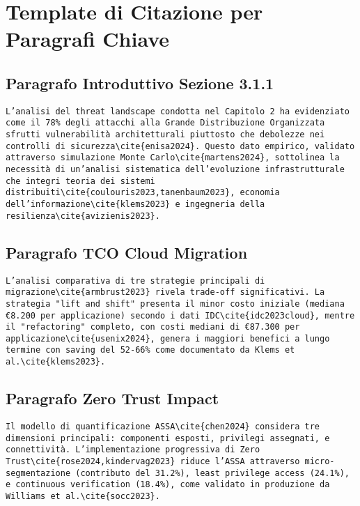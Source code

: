 \documentclass{article}
\begin{document}
\section*{Template di Citazione per Paragrafi Chiave}

\subsection*{Paragrafo Introduttivo Sezione 3.1.1}
\begin{tcolorbox}[colback=gray!10]
\small
\texttt{L'analisi del threat landscape condotta nel Capitolo 2 ha evidenziato come il 78\% degli attacchi alla Grande Distribuzione Organizzata sfrutti vulnerabilità architetturali piuttosto che debolezze nei controlli di sicurezza\textbackslash cite\{enisa2024\}. Questo dato empirico, validato attraverso simulazione Monte Carlo\textbackslash cite\{martens2024\}, sottolinea la necessità di un'analisi sistematica dell'evoluzione infrastrutturale che integri teoria dei sistemi distribuiti\textbackslash cite\{coulouris2023,tanenbaum2023\}, economia dell'informazione\textbackslash cite\{klems2023\} e ingegneria della resilienza\textbackslash cite\{avizienis2023\}.}
\end{tcolorbox}

\subsection*{Paragrafo TCO Cloud Migration}
\begin{tcolorbox}[colback=gray!10]
\small
\texttt{L'analisi comparativa di tre strategie principali di migrazione\textbackslash cite\{armbrust2023\} rivela trade-off significativi. La strategia "lift and shift" presenta il minor costo iniziale (mediana €8.200 per applicazione) secondo i dati IDC\textbackslash cite\{idc2023cloud\}, mentre il "refactoring" completo, con costi mediani di €87.300 per applicazione\textbackslash cite\{usenix2024\}, genera i maggiori benefici a lungo termine con saving del 52-66\% come documentato da Klems et al.\textbackslash cite\{klems2023\}.}
\end{tcolorbox}

\subsection*{Paragrafo Zero Trust Impact}
\begin{tcolorbox}[colback=gray!10]
\small
\texttt{Il modello di quantificazione ASSA\textbackslash cite\{chen2024\} considera tre dimensioni principali: componenti esposti, privilegi assegnati, e connettività. L'implementazione progressiva di Zero Trust\textbackslash cite\{rose2024,kindervag2023\} riduce l'ASSA attraverso micro-segmentazione (contributo del 31.2\%), least privilege access (24.1\%), e continuous verification (18.4\%), come validato in produzione da Williams et al.\textbackslash cite\{socc2023\}.}
\end{tcolorbox}
\end{document}
